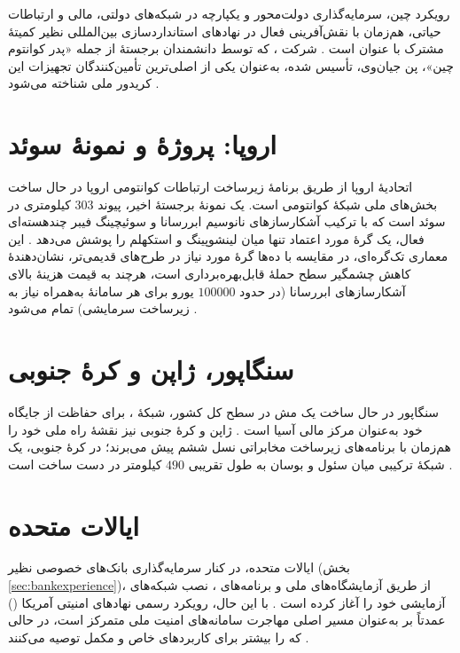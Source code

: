 رویکرد چین، سرمایه‌گذاری دولت‌محور و یکپارچه در شبکه‌های دولتی، مالی و ارتباطات حیاتی، هم‌زمان با نقش‌آفرینی فعال در نهادهای استانداردسازی بین‌المللی نظیر کمیتهٔ مشترک  با عنوان  است \Cite{iiss2026governance}. شرکت ، که توسط دانشمندان برجستهٔ  از جمله «پدر کوانتوم چین»، پن جیان‌وی، تأسیس شده، به‌عنوان یکی از اصلی‌ترین تأمین‌کنندگان تجهیزات این کریدور ملی شناخته می‌شود \Cite{itif2024china}.

\section{اروپا: پروژهٔ  و نمونهٔ سوئد}

اتحادیهٔ اروپا از طریق برنامهٔ زیرساخت ارتباطات کوانتومی اروپا  در حال ساخت بخش‌های ملی شبکهٔ کوانتومی است. یک نمونهٔ برجستهٔ اخیر، پیوند $303$ کیلومتری در سوئد است که با ترکیب آشکارسازهای نانوسیم ابررسانا  و سوئیچینگ فیبر چندهسته‌ای فعال، یک گرهٔ مورد اعتماد تنها میان لینشوپینگ و استکهلم را پوشش می‌دهد \Cite{arxiv2606sweden,techtimes2026sweden}. این معماری تک‌گره‌ای، در مقایسه با ده‌ها گرهٔ مورد نیاز در طرح‌های قدیمی‌تر، نشان‌دهندهٔ کاهش چشمگیر سطح حملهٔ قابل‌بهره‌برداری  است، هرچند به قیمت هزینهٔ بالای آشکارسازهای ابررسانا (در حدود $100000$ یورو برای هر سامانهٔ  به‌همراه نیاز به زیرساخت سرمایشی) تمام می‌شود \Cite{techtimes2026sweden}.

\section{سنگاپور، ژاپن و کرهٔ جنوبی}

سنگاپور در حال ساخت یک مش  در سطح کل کشور، شبکهٔ ، برای حفاظت از جایگاه خود به‌عنوان مرکز مالی آسیا است \Cite{marketintelo2026}. ژاپن و کرهٔ جنوبی نیز نقشهٔ راه ملی  خود را هم‌زمان با برنامه‌های زیرساخت مخابراتی نسل ششم  پیش می‌برند؛ در کرهٔ جنوبی، یک شبکهٔ ترکیبی میان سئول و بوسان به طول تقریبی $490$ کیلومتر در دست ساخت است \Cite{npl2020progress}.

\section{ایالات متحده}

ایالات متحده، در کنار سرمایه‌گذاری بانک‌های خصوصی نظیر  (بخش \ref{sec:bankexperience})، از طریق آزمایشگاه‌های ملی و برنامه‌های ، نصب شبکه‌های آزمایشی  خود را آغاز کرده است \Cite{npjqi2016}. با این حال، رویکرد رسمی نهادهای امنیتی آمریکا () عمدتاً بر  به‌عنوان مسیر اصلی مهاجرت سامانه‌های امنیت ملی متمرکز است، در حالی که  را بیشتر برای کاربردهای خاص و مکمل توصیه می‌کنند \Cite{techtimes2026sweden}.

